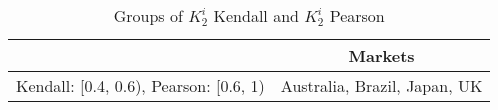 
\begin{table}[ph]
\centering
\small
\begin{tabular}{ |c|c| }
\hline
& Markets \\
\hline
    Kendall: [0.4, 0.6), Pearson: [0.6, 1) & Australia, Brazil, Japan, UK \\ 
 \hline 
\end{tabular}
    \caption{Groups of $K_2^i$ Kendall and $K_2^i$ Pearson}
    \end{table}

